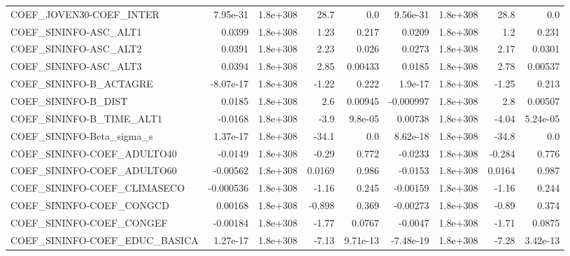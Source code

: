 \begin{tabular}{lrrrrrrrr}
COEF\_JOVEN30-COEF\_INTER           &    7.95e-31 &     1.8e+308 &      28.7 &      0.0 &   9.56e-31 &    1.8e+308 &         28.8 &           0.0 \\
COEF\_SININFO-ASC\_ALT1             &      0.0399 &     1.8e+308 &      1.23 &    0.217 &     0.0209 &    1.8e+308 &          1.2 &         0.231 \\
COEF\_SININFO-ASC\_ALT2             &      0.0391 &     1.8e+308 &      2.23 &    0.026 &     0.0273 &    1.8e+308 &         2.17 &        0.0301 \\
COEF\_SININFO-ASC\_ALT3             &      0.0394 &     1.8e+308 &      2.85 &  0.00433 &     0.0185 &    1.8e+308 &         2.78 &       0.00537 \\
COEF\_SININFO-B\_ACTAGRE            &   -8.07e-17 &     1.8e+308 &     -1.22 &    0.222 &    1.9e-17 &    1.8e+308 &        -1.25 &         0.213 \\
COEF\_SININFO-B\_DIST               &      0.0185 &     1.8e+308 &       2.6 &  0.00945 &  -0.000997 &    1.8e+308 &          2.8 &       0.00507 \\
COEF\_SININFO-B\_TIME\_ALT1          &     -0.0168 &     1.8e+308 &      -3.9 &  9.8e-05 &    0.00738 &    1.8e+308 &        -4.04 &      5.24e-05 \\
COEF\_SININFO-Beta\_sigma\_s         &    1.37e-17 &     1.8e+308 &     -34.1 &      0.0 &   8.62e-18 &    1.8e+308 &        -34.8 &           0.0 \\
COEF\_SININFO-COEF\_ADULTO40        &     -0.0149 &     1.8e+308 &     -0.29 &    0.772 &    -0.0233 &    1.8e+308 &       -0.284 &         0.776 \\
COEF\_SININFO-COEF\_ADULTO60        &    -0.00562 &     1.8e+308 &    0.0169 &    0.986 &    -0.0153 &    1.8e+308 &       0.0164 &         0.987 \\
COEF\_SININFO-COEF\_CLIMASECO       &   -0.000536 &     1.8e+308 &     -1.16 &    0.245 &   -0.00159 &    1.8e+308 &        -1.16 &         0.244 \\
COEF\_SININFO-COEF\_CONGCD          &     0.00168 &     1.8e+308 &    -0.898 &    0.369 &   -0.00273 &    1.8e+308 &        -0.89 &         0.374 \\
COEF\_SININFO-COEF\_CONGEF          &    -0.00184 &     1.8e+308 &     -1.77 &   0.0767 &    -0.0047 &    1.8e+308 &        -1.71 &        0.0875 \\
COEF\_SININFO-COEF\_EDUC\_BASICA     &    1.27e-17 &     1.8e+308 &     -7.13 & 9.71e-13 &  -7.48e-19 &    1.8e+308 &        -7.28 &      3.42e-13 \\

\end{tabular}
